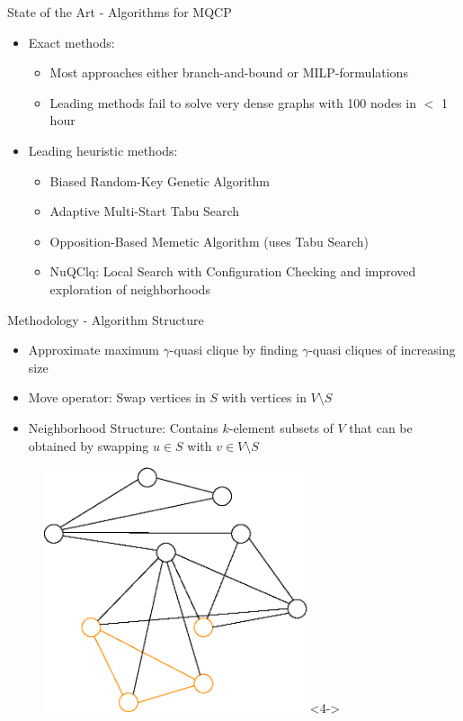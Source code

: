 \documentclass{beamer}
\begin{document}
\begin{frame}{State of the Art - Algorithms for MQCP}
    \begin{itemize}
        \item<1-> Exact methods:
        \begin{itemize}
            \item Most approaches either branch-and-bound or MILP-formulations
            \item Leading methods fail to solve very dense graphs with 100 nodes in $<$ 1 hour
        \end{itemize}
        \item<2-> Leading heuristic methods:
        \begin{itemize}
            \item Biased Random-Key Genetic Algorithm \cite{pinto_biased_2018}
            \item Adaptive Multi-Start Tabu Search \cite{djeddi_extension_2019}
            \item Opposition-Based Memetic Algorithm (uses Tabu Search) \cite{zhou_opposition-based_2020}
            \item NuQClq: Local Search with Configuration Checking and improved exploration of neighborhoods \cite{chen_nuqclq_2021}
        \end{itemize}
    \end{itemize}
\end{frame}

\begin{frame}{Methodology - Algorithm Structure}
    \begin{itemize}
        \item<1-> Approximate maximum $\gamma$-quasi clique by finding $\gamma$-quasi cliques of increasing size
        \item<2-> Move operator: Swap vertices in $S$ with vertices in $V \setminus S$
        \item<3-> Neighborhood Structure: Contains $k$-element subsets of $V$ that can be obtained by swapping $u \in S$ with $v \in V \setminus S$
    \end{itemize}
    
\begin{figure}
    \centering
    \includegraphics[width=0.7\textwidth]{graphics/graph-before-swap.eps}<4->
\end{figure}
\end{frame}
\end{document}
